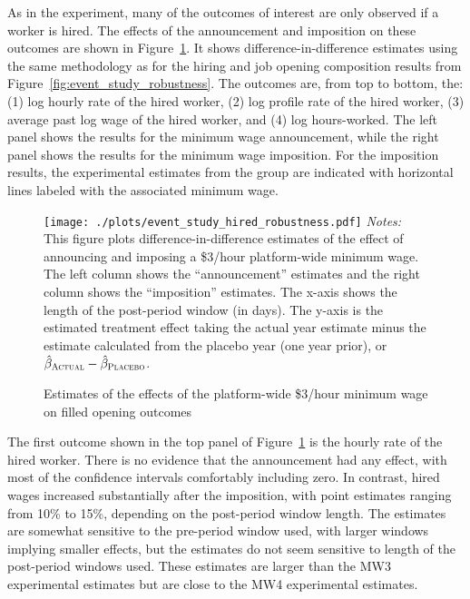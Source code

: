 As in the experiment, many of the outcomes of interest are only observed if a worker is hired. 
The effects of the announcement and imposition on these outcomes are shown in Figure~\ref{fig:event_study_hired_robustness}.
It shows difference-in-difference estimates using the same methodology as for the hiring and job opening composition results from Figure~\ref{fig:event_study_robustness}.  
The outcomes are, from top to bottom, the: 
(1) log hourly rate of the hired worker,
(2) log profile rate of the hired worker, 
(3) average past log wage of the hired worker, and 
(4) log hours-worked.  
The left panel shows the results for the minimum wage announcement, while the right panel shows the results for the minimum wage imposition.
For the imposition results, the experimental estimates from the \all{} group are indicated with horizontal lines labeled with the associated minimum wage. 

\begin{figure}[h!]
\centering 
\caption{Estimates of the effects of the platform-wide \$3/hour minimum wage on filled opening outcomes} \label{fig:event_study_hired_robustness} 
\begin{minipage}{0.90 \linewidth}
\texttt{[image: ./plots/event\_study\_hired\_robustness.pdf]} 
{\footnotesize
  \emph{Notes:}
  This figure plots difference-in-difference estimates of the effect of announcing and imposing a \$3/hour platform-wide minimum wage. 
  The left column shows the ``announcement'' estimates and the right column shows the ``imposition'' estimates.
  The x-axis shows the length of the post-period window (in days).
  The y-axis is the estimated treatment effect taking the actual year estimate minus the estimate calculated from the placebo year (one year prior), or $\hat{\beta}_{\textsc{Actual}} - \hat{\beta}_{\textsc{Placebo}}$. 
}
\end{minipage} 
\end{figure} 

The first outcome shown in the top panel of Figure~\ref{fig:event_study_hired_robustness} is the hourly rate of the hired worker.
There is no evidence that the announcement had any effect, with most of the confidence intervals comfortably including zero. 
In contrast, hired wages increased substantially after the imposition, with point estimates ranging from 10\% to 15\%, depending on the post-period window length.
The estimates are somewhat sensitive to the pre-period window used, with larger windows implying smaller effects, but the estimates do not seem sensitive to length of the post-period windows used. 
These estimates are larger than the MW3 experimental estimates but are close to the MW4 experimental estimates. %

